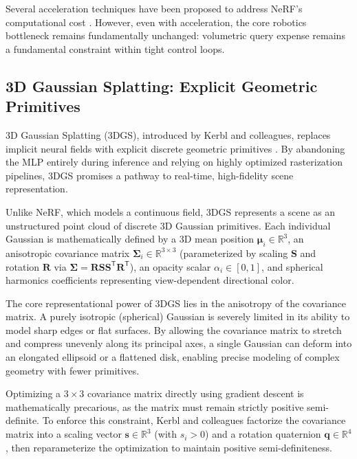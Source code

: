 \documentclass[12pt,a4paper,oneside]{report}
\begin{document}
Several acceleration techniques have been proposed to address NeRF's computational cost \cite{muller2022instant, barron2021mip, barron2023zipnerf}. However, even with acceleration, the core robotics bottleneck remains fundamentally unchanged: volumetric query expense remains a fundamental constraint within tight control loops.

\subsection{3D Gaussian Splatting: Explicit Geometric Primitives}

3D Gaussian Splatting (3DGS), introduced by Kerbl and colleagues, replaces implicit neural fields with explicit discrete geometric primitives \cite{kerbl20233d}. By abandoning the MLP entirely during inference and relying on highly optimized rasterization pipelines, 3DGS promises a pathway to real-time, high-fidelity scene representation.

Unlike NeRF, which models a continuous field, 3DGS represents a scene as an unstructured point cloud of discrete 3D Gaussian primitives. Each individual Gaussian is mathematically defined by a 3D mean position $\boldsymbol{\mu}_i \in \mathbb{R}^3$, an anisotropic covariance matrix $\boldsymbol{\Sigma}_i \in \mathbb{R}^{3 \times 3}$ (parameterized by scaling $\mathbf{S}$ and rotation $\mathbf{R}$ via $\boldsymbol{\Sigma} = \mathbf{R} \mathbf{S} \mathbf{S}^\mathsf{T} \mathbf{R}^\mathsf{T}$), an opacity scalar $\alpha_i \in [0, 1]$, and spherical harmonics coefficients representing view-dependent directional color.

The core representational power of 3DGS lies in the anisotropy of the covariance matrix. A purely isotropic (spherical) Gaussian is severely limited in its ability to model sharp edges or flat surfaces. By allowing the covariance matrix to stretch and compress unevenly along its principal axes, a single Gaussian can deform into an elongated ellipsoid or a flattened disk, enabling precise modeling of complex geometry with fewer primitives.

Optimizing a $3 \times 3$ covariance matrix directly using gradient descent is mathematically precarious, as the matrix must remain strictly positive semi-definite. To enforce this constraint, Kerbl and colleagues factorize the covariance matrix into a scaling vector $\mathbf{s} \in \mathbb{R}^3$ (with $s_i > 0$) and a rotation quaternion $\mathbf{q} \in \mathbb{R}^4$, then reparameterize the optimization to maintain positive semi-definiteness.
\end{document}

